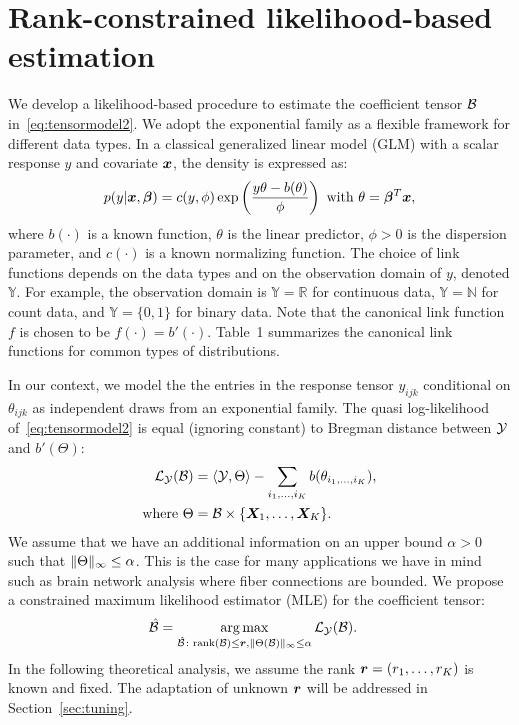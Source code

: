 \documentclass[12pt]{article}
\theoremstyle{plain}
\theoremstyle{definition}
\begin{document}
\section{Rank-constrained likelihood-based estimation}
We develop a likelihood-based procedure to estimate the coefficient tensor $\mathcal{B}$ in~\eqref{eq:tensormodel2}. We adopt the exponential family as a flexible framework for different data types. In a classical generalized linear model (GLM) with a scalar response $y$ and covariate $\bm x$, the density is expressed as:
\[
p(y|\bm x, \boldsymbol{\beta})=c(y,\phi)\exp\left({y\theta- b(\theta) \over \phi}\right)\ \text{with}\ \theta=\boldsymbol{\beta}^T\bm x,
\]
where $b(\cdot)$ is a known function, $\theta$ is the linear predictor, $\phi>0$ is the dispersion parameter, and $c(\cdot)$ is a known normalizing function. The choice of link functions depends on the data types and on the observation domain of $y$, denoted $\mathbb{Y}$. For example, the observation domain is $\mathbb{Y}=\mathbb{R}$ for continuous data, $\mathbb{Y}=\mathbb{N}$ for count data, and  $\mathbb{Y}=\{0,1\}$ for binary data. 
Note that the canonical link function $f$ is chosen to be $f(\cdot)=b'(\cdot)$. Table~1 summarizes the canonical link functions for common types of distributions. 

In our context, we model the the entries in the response tensor $y_{ijk}$ conditional on $\theta_{ijk}$ as independent draws from an exponential family. The quasi log-likelihood of~\eqref{eq:tensormodel2} is equal (ignoring constant) to Bregman distance between $\mathcal{Y}$ and $b'(\Theta)$:
\begin{align}
\mathcal{L}_{\mathcal{Y}}(\mathcal{B})&=\langle \mathcal{Y}, \Theta \rangle - \sum_{i_1,\ldots,i_K} b(\theta_{i_1,\ldots,i_K}),\\
\text{where}\ \Theta&=\mathcal{B}\times\{\bm X_1,\ldots,\bm X_K\}.
\end{align}
We assume that we have an additional information on an upper bound $\alpha>0$ such that $\lVert\Theta\rVert_\infty\leq \alpha$. This is the case for many applications we have in mind such as brain network analysis where fiber connections are bounded. We propose a constrained maximum likelihood estimator (MLE) for the coefficient tensor:
\begin{align} \label{eq:MLE} 
	\hat {\mathcal{B}} &=\operatorname*{arg\,max}_{\hat {\mathcal{B}} \colon \text{rank}(\mathcal{B})\leq \bm{r}, \lVert\Theta(\mathcal{B})\rVert_\infty\leq \alpha  } \mathcal{L}_{\mathcal{Y}}(\mathcal{B}).
\end{align}
In the following theoretical analysis, we assume the rank $\bm{r}=(r_1,\ldots,r_K)$ is known and fixed. The adaptation of unknown $\bm{r}$ will be addressed in Section~\ref{sec:tuning}. 
\end{document}
